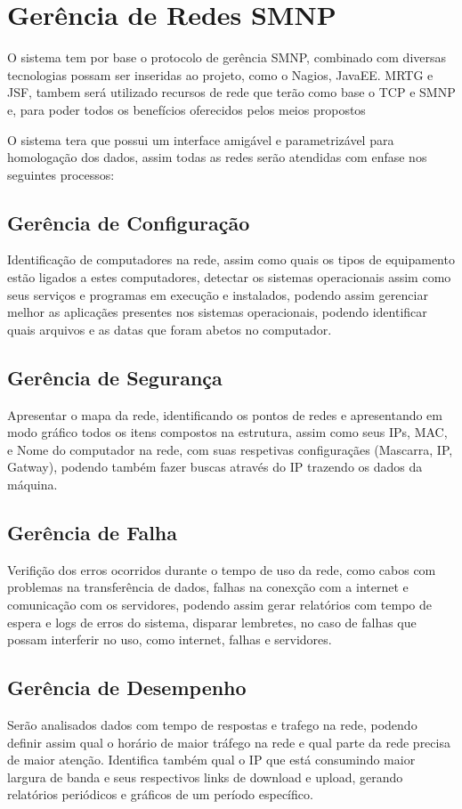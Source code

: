 \documentclass[12pt,a4paper]{abntex2}
\begin{document}
\chapter{Gerência de Redes SMNP}

\par
O sistema tem por base o protocolo de gerência SMNP, combinado com diversas
tecnologias possam ser inseridas ao projeto, como o Nagios, JavaEE. MRTG e JSF,
tambem será utilizado recursos de rede que terão como base o TCP e SMNP e, para
poder todos os benefícios oferecidos pelos meios propostos

\par
O sistema tera que possui um interface amigável e parametrizável para
homologação dos dados, assim todas as redes serão atendidas com enfase nos
seguintes processos:


\section{Gerência de Configuração}
\par
Identificação de computadores na rede, assim como quais os tipos de equipamento
estão ligados a estes computadores, detectar os sistemas operacionais assim como seus serviços e programas em execução e
instalados, podendo assim gerenciar melhor as aplicaçães presentes nos sistemas
operacionais, podendo identificar quais arquivos e as datas que foram abetos no computador.

\par
\section{Gerência de Segurança}

Apresentar o mapa da rede, identificando os pontos de redes e apresentando em
modo gráfico todos os itens compostos na estrutura, assim como seus IPs, MAC, 
e Nome do computador na rede, com suas respetivas configuraçães (Mascarra, IP,
Gatway), podendo também fazer buscas através do IP trazendo os dados da máquina.


\section{Gerência de Falha}
\par
Verifição dos erros ocorridos durante o tempo de uso da rede, como cabos com
problemas na transferência de dados, falhas na conexção com a internet e
comunicação com os servidores, podendo assim gerar relatórios com tempo de espera e logs de erros do sistema, 
disparar lembretes, no caso de falhas que possam interferir no uso, como internet, falhas e servidores.

\section{Gerência de Desempenho}
\par
Serão analisados dados com tempo de respostas e trafego na rede, podendo definir
assim qual o horário de maior tráfego na rede e qual parte da rede precisa de
maior atenção. Identifica também qual o IP que está consumindo maior largura de
banda e seus respectivos links de download e upload, gerando relatórios
periódicos e gráficos de um período específico.
\end{document}
